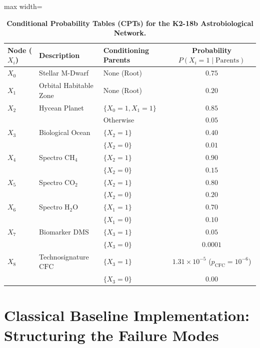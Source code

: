 \begin{table}[htbp]
\centering
\caption{\textbf{Conditional Probability Tables (CPTs) for the K2-18b Astrobiological Network.}}
\label{tab:k218b_cpts}
\begin{adjustbox}{max width=\textwidth}
\small
\begin{tabular}{lllc}
\toprule
\textbf{Node ($X_i$)} & \textbf{Description} & \textbf{Conditioning Parents} & \textbf{Probability $P(X_i = 1 \mid \mathrm{Parents})$} \\
\midrule
$X_0$ & Stellar M-Dwarf & None (Root) & $0.75$ \\
$X_1$ & Orbital Habitable Zone & None (Root) & $0.20$ \\
$X_2$ & Hycean Planet & $\{X_0=1, X_1=1\}$ & $0.85$ \\
      &               & Otherwise & $0.05$ \\
$X_3$ & Biological Ocean & $\{X_2=1\}$ & $0.40$ \\
      &                  & $\{X_2=0\}$ & $0.01$ \\
$X_4$ & Spectro $\mathrm{CH}_4$ & $\{X_2=1\}$ & $0.90$ \\
      &                         & $\{X_2=0\}$ & $0.15$ \\
$X_5$ & Spectro $\mathrm{CO}_2$ & $\{X_2=1\}$ & $0.80$ \\
      &                         & $\{X_2=0\}$ & $0.20$ \\
$X_6$ & Spectro $\mathrm{H}_2\mathrm{O}$ & $\{X_1=1\}$ & $0.70$ \\
      &                                  & $\{X_1=0\}$ & $0.10$ \\
$X_7$ & Biomarker $\mathrm{DMS}$ & $\{X_3=1\}$ & $0.05$ \\
      &                          & $\{X_3=0\}$ & $0.0001$ \\
$X_8$ & Technosignature $\mathrm{CFC}$ & $\{X_3=1\}$ & $1.31 \times 10^{-5}$ ($p_{\mathrm{CFC}} = 10^{-6}$) \\
      &                                & $\{X_3=0\}$ & $0.00$ \\
\bottomrule
\end{tabular}
\end{adjustbox}
\end{table}

\section{Classical Baseline Implementation: Structuring the Failure Modes}\label{sec:classical_baseline_impl}

